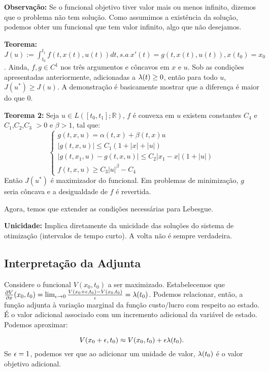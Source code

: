 \textbf{Observação:} Se o funcional objetivo tiver valor mais ou menos infinito, dizemos que o problema não tem solução. Como assumimos a existência da solução, podemos obter um funcional que tem valor infinito, algo que não desejamos. 

\textbf{Teorema:} $J(u) := \int_{t_0}^{t_1} f(t,x(t),u(t))dt, s.a~x'(t) = g(t,x(t),u(t)), x(t_0) = x_0$. Ainda, $f, g \in C^1$ nos três argumentos e côncavos em $x$ e $u$. Sob as condições apresentadas anteriormente, adicionadas a $\lambda(t) \geq 0$, então para todo $u$, $J(u^*) \geq J(u)$. A demonstração é basicamente mostrar que a diferença é maior do que $0$.

\textbf{Teorema 2:} Seja $u \in L([t_0,t_1];\mathbb{R})$, $f$ é convexa em $u$ existem constantes $C_4$ e $C_1$,$C_2$,$C_3$ $>0$ e $\beta > 1$, tal que:
\begin{equation*}
    \begin{cases}
        g(t,x,u) = \alpha (t,x) + \beta (t,x)u \\
        |g(t,x,u)| \leq C_1(1 + |x| + |u|) \\
        |g(t,x_1,u) - g(t,x,u)| \leq C_2|x_1 - x|(1 + |u|) \\
        f(t,x,u) \geq C_3|u|^{\beta} - C_4
    \end{cases}
\end{equation*}
Então $J(u^*)$ é maximizador do funcional. Em problemas de minimização, $g$ seria côncava e a desigualdade de $f$ é revertida. 

Agora, temos que extender as condições necessárias para Lebesgue. 

\textbf{Unicidade:} Implica diretamente da unicidade das soluções do sistema de otimização (intervalos de tempo curto). A volta não é sempre verdadeira.  

\subsection{Interpretação da Adjunta}

Considere o funcional $V(x_0, t_0)$ a ser maximizado. Estabelecemos que $\frac{\partial V}{\partial x}(x_0, t_0) = \lim_{\epsilon \to 0} \frac{V(x_0 + \epsilon, t_0) - V(x_0,t_0)}{\epsilon} = \lambda(t_0)$. Podemos relacionar, então, a função adjunta à variação marginal da função custo/lucro com respeito ao estado. É o valor adicional associado com um incremento adicional da variável de estado. Podemos aproximar: 

\begin{equation*}
    V(x_0 + \epsilon,t_0) \approx V(x_0,t_0) + \epsilon\lambda(t_0). 
\end{equation*}
Se $\epsilon = 1$, podemos ver que ao adicionar um unidade de valor, $\lambda(t_0)$ é o valor objetivo adicional. 

